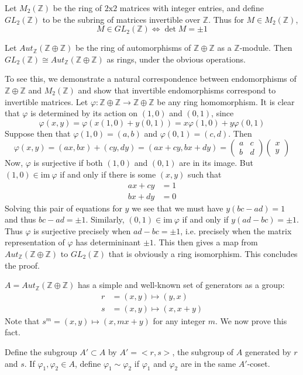 \documentclass[12pt]{article}
\newcommand{\Ints}{\mathbb{Z}}
\begin{document}
Let $M_2(\Ints)$ be the ring of $2\textrm{x}2$ matrices with integer entries, and define
$GL_2(\Ints)$ to be the subring of matrices invertible over $\Ints$. Thus for $M\in M_2(\Ints)$,
\[M\in GL_2(\Ints)\iff \det M=\pm 1\]

Let $Aut_{\Ints}(\Ints\oplus\Ints)$ be the ring of automorphisms of $\Ints\oplus\Ints$ as a $\Ints$-module. Then $GL_2(\Ints)\cong Aut_{\Ints}(\Ints\oplus\Ints)$
as rings, under the obvious operations.

To see this, we demonstrate a natural correspondence between endomorphisms of $\Ints\oplus\Ints$ and $M_2(\Ints)$ and show that invertible endomorphisms correspond to invertible matrices. Let $\varphi: \Ints\oplus\Ints\to \Ints\oplus\Ints$ be any ring homomorphism. It is clear that $\varphi$ is determined by its action on $(1,0)$ and $(0,1)$, since
\[\varphi(x,y)=\varphi(x(1,0)+y(0,1))=x\varphi(1,0)+y\varphi(0,1)\]
Suppose then that $\varphi(1,0)=(a,b)$ and $\varphi(0,1)=(c,d)$. Then
\[\varphi(x,y)=(ax,bx)+(cy,dy)=(ax+cy,bx+dy)=\begin{pmatrix}a&c\\b&d\end{pmatrix}\begin{pmatrix}x\\y\end{pmatrix}\]
Now, $\varphi$ is surjective if both $(1,0)$ and $(0,1)$ are in its image. But $(1,0)\in\textrm{im}\  \varphi$ if and only if there is some $(x,y)$ such that
\begin{align*}
ax+cy&=1\\
bx+dy&=0
\end{align*}
Solving this pair of equations for $y$ we see that we must have $y(bc-ad)=1$ and thus $bc-ad=\pm 1$. Similarly, $(0,1)\in\textrm{im}\ \varphi$ if and only if $y(ad-bc)=\pm 1$. Thus $\varphi$ is surjective precisely when $ad-bc=\pm 1$, i.e. precisely when the matrix representation of $\varphi$ has determininant $\pm 1$. This then gives a map from $Aut_{\Ints}(\Ints\oplus\Ints)$ to $GL_2(\Ints)$ that is obviously a ring isomorphism. This concludes the proof.

$A=Aut_{\Ints}(\Ints\oplus\Ints)$ has a simple and well-known set of generators as a group:
\begin{align*}r&=(x,y)\mapsto(y,x)\\
s&=(x,y)\mapsto(x,x+y)
\end{align*}
Note that $s^m=(x,y)\mapsto(x,mx+y)$ for any integer $m$. We now prove this fact.

Define the subgroup $A'\subset A$ by $A'=<r,s>$, the subgroup of $A$ generated by $r$ and $s$. If $\varphi_1,\varphi_2\in A$, define $\varphi_1\sim\varphi_2$ if $\varphi_1$ and $\varphi_2$ are in the same $A'$-coset. 
\end{document}

